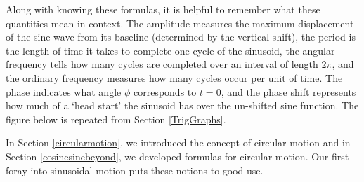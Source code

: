 \medskip

Along with knowing these formulas, it is helpful to remember what these quantities mean in context.  The amplitude measures the maximum displacement of the sine wave from its baseline (determined by the vertical shift), the period is the length of time it takes to complete one cycle of the sinusoid, the angular frequency tells how many cycles are completed over an interval of length $2\pi$, and the ordinary frequency measures how many cycles occur per unit of time. The phase indicates what angle $\phi$ corresponds to $t=0$, and the phase shift represents how much of a `head start' the sinusoid has over the un-shifted sine function.  The figure below is repeated from Section \ref{TrigGraphs}.



In Section \ref{circularmotion}, we introduced the concept of circular motion and in Section \ref{cosinesinebeyond}, we developed formulas for circular motion.  Our first foray into sinusoidal motion puts these notions to good use. 

\medskip

